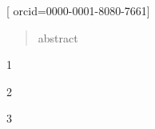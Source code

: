 \documentclass[a4paper,fleqn]{cas-sc}
\begin{document}

       
\author{Oleksii Zavhorodnii}[
       orcid=0000-0001-8080-7661]       









\begin{abstract}
abstract
\end{abstract}


\begin{highlights}
\item 1
\item 2
\item 3
\end{highlights}
\end{document}
